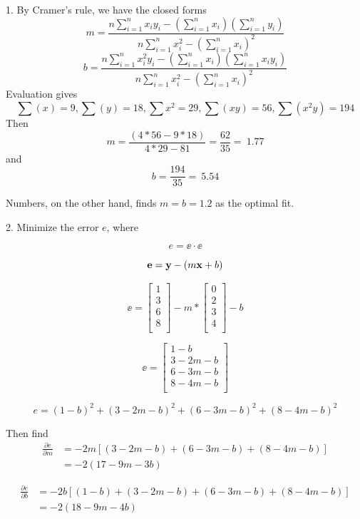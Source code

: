 \documentclass[12pt,letterpaper]{hmcpset}
\begin{document}
\begin{solution}
1. By Cramer's rule, we have the closed forms
\[
    m = \frac{n\sum_{i=1}^n x_iy_i - (\sum_{i=1}^n x_i)(\sum_{i=1}^n y_i)}{n\sum_{i=1}^n x_i^2 - (\sum_{i=1}^n x_i)^2}
\]
\[
    b = \frac{n\sum_{i=1}^n x_i^2y_i - (\sum_{i=1}^n x_i)(\sum_{i=1}^n x_iy_i)}{n\sum_{i=1}^n x_i^2 - (\sum_{i=1}^n x_i)^2}
\]
Evaluation gives
\[
\sum(x) = 9, \sum(y) = 18, \sum{x^2} = 29, \sum(xy) = 56, \sum(x^2y) = 194
\]
Then
\[
m = \frac{(4*56 - 9*18)}{4*29 - 81}
= \frac{62}{35} =~ 1.77
\]
and
\[
b = \frac{194}{35} =~ 5.54
\]

Numbers, on the other hand, finds $m = b = 1.2$ as the optimal fit.

2. Minimize the error $e$, where

\[
 e = \ee \cdot \ee
\]

\[
 {\bf e} = {\bf y} - ( m {\bf x} + b )
\]

\[
 \ee =
 \begin{bmatrix}
   1 \\
   3 \\
   6 \\
   8 \\
\end{bmatrix}
 - m *
\begin{bmatrix}
  0 \\
  2 \\
  3 \\
  4 \\
\end{bmatrix}
 - b
\]

\[
 \ee =
 \begin{bmatrix}
   1 - b\\
   3 - 2m - b\\
   6 - 3m - b\\
   8 - 4m - b\\
\end{bmatrix}
 \]

\[
e = (1-b)^2 + (3 - 2m - b)^2 + (6 - 3m - b)^2 + (8 - 4m - b)^2
\]

Then find
\[
\begin{aligned}
\frac{\partial e}{\partial m} & = -2m[(3 - 2m - b) + (6 - 3m - b) + (8 - 4m - b)] \\
& = -2(17 - 9m - 3b)
\end{aligned}
\]

\[
\begin{aligned}
\frac{\partial e}{\partial b} & = -2b[(1-b) + (3 - 2m - b) + (6 - 3m - b) + (8 - 4m - b)] \\
& = -2(18 - 9m - 4b)
\end{aligned}
 \]


\end{solution}
\end{document}
